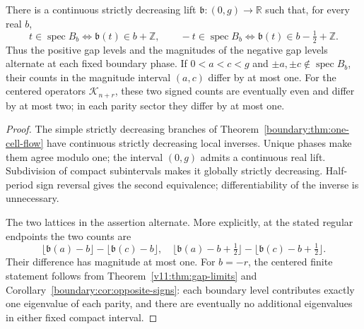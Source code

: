 \begin{corollary}
\label{interaction:cor:boundary-alternation}
There is a continuous strictly decreasing lift
$\mathfrak b:(0,g)\to\mathbb R$ such that, for every real $b$,
\[
 t\in\operatorname{spec}B_b
 \iff\mathfrak b(t)\in b+\mathbb Z,
 \qquad
 -t\in\operatorname{spec}B_b
 \iff\mathfrak b(t)\in b-\tfrac12+\mathbb Z.
\]
Thus the positive gap levels and the magnitudes of the negative gap
levels alternate at each fixed boundary phase. If $0<a<c<g$ and
$\pm a,\pm c\notin\operatorname{spec}B_b$, their counts in the
magnitude interval $(a,c)$ differ by at most one.
For the centered operators $\mathcal K_{n+r}$, these two signed counts
are eventually even and differ by at most two; in each parity sector
they differ by at most one.
\end{corollary}
\begin{proof}
The simple strictly decreasing branches of
Theorem~\ref{boundary:thm:one-cell-flow} have continuous strictly
decreasing local inverses. Unique phases make them agree modulo one;
the interval $(0,g)$ admits a continuous real lift. Subdivision of
compact subintervals makes it globally strictly decreasing.
Half-period sign reversal gives the second equivalence; differentiability
of the inverse is unnecessary.

The two lattices in the assertion alternate. More explicitly, at the
stated regular endpoints the two counts are
\[
 \lfloor\mathfrak b(a)-b\rfloor-\lfloor\mathfrak b(c)-b\rfloor,
 \quad
 \lfloor\mathfrak b(a)-b+\tfrac12\rfloor
       -\lfloor\mathfrak b(c)-b+\tfrac12\rfloor.
\]
Their difference has magnitude at most one. For $b=-r$, the centered
finite statement follows from Theorem~\ref{v11:thm:gap-limits} and
Corollary~\ref{boundary:cor:opposite-signs}: each boundary level
contributes exactly one eigenvalue of each parity, and there are
eventually no additional eigenvalues in either fixed compact interval.
\end{proof}

